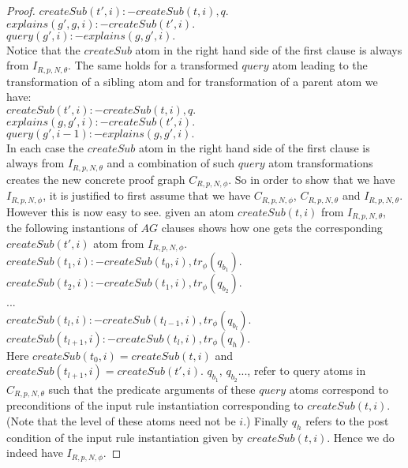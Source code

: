 \begin{proof}
$createSub(t',i):-createSub(t,i),q.$\\
$explains(g',g,i):-createSub(t',i).$\\
$query(g',i):-explains(g,g',i).$\\
Notice that the $createSub$ atom in the right hand side of the first clause is always from $I_{R,p,N,\theta}$. The same holds for a transformed $query$ atom leading to the transformation of a sibling atom and for transformation of a parent atom we have:\\
$createSub(t',i):-createSub(t,i),q.$\\
$explains(g,g',i):-createSub(t',i).$\\
$query(g',i-1):-explains(g,g',i).$\\
In each case the $createSub$ atom in the right hand side of the first clause is always from $I_{R,p,N,\theta}$ and a combination of such $query$ atom transformations creates the new concrete proof graph $C_{R,p,N,\phi}$. So in order to show that we have $I_{R,p,N,\phi}$, it is justified to first assume that we have $C_{R,p,N,\phi}$, $C_{R,p,N,\theta}$ and $I_{R,p,N,\theta}$. However this is now easy to see. given an atom $createSub(t,i)$ from $I_{R,p,N,\theta}$, the following instantions of $AG$ clauses shows how one gets the corresponding $createSub(t',i)$ atom from $I_{R,p,N,\phi}$.\\
$createSub(t_{1},i):-createSub(t_{0},i),tr_{\phi}(q_{b_{1}}).$\\
$createSub(t_{2},i):-createSub(t_{1},i),tr_{\phi}(q_{b_{2}}).$\\ ...\\
$createSub(t_{l},i):-createSub(t_{l-1},i),tr_{\phi}(q_{b_{l}}).$\\
$createSub(t_{l+1},i):-createSub(t_{l},i),tr_{\phi}(q_{h}).$\\
Here $createSub(t_{0},i) = createSub(t,i)$ and $createSub(t_{l+1},i) = createSub(t',i)$. $q_{b_{1}}$, $q_{b_{2}}$..., refer to query atoms in $C_{R,p,N,\theta}$  such that the predicate arguments of these $query$ atoms correspond to preconditions of the input rule instantiation corresponding to $createSub(t,i)$. (Note that the level of these atoms need not be $i$.) Finally $q_{h}$ refers to the post condition of the input rule instantiation given by $createSub(t,i)$. Hence we do indeed have $I_{R,p,N,\phi}$.
\end{proof}


%


